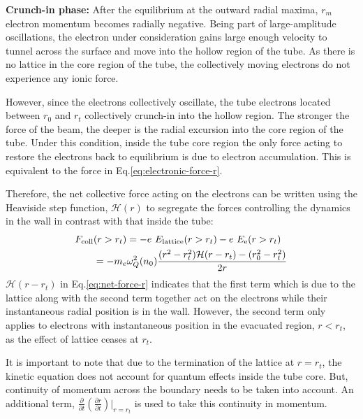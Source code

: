 \documentclass[aps,twocolumn,notitlepage,superscriptaddress]{revtex4-1}
\begin{document}
{\bf Crunch-in phase:} After the equilibrium at the outward radial maxima, $r_m$ electron momentum becomes radially negative. Being part of large-amplitude oscillations, the electron under consideration gains large enough velocity to tunnel across the surface and move into the hollow region of the tube. As there is no lattice in the core region of the tube, the collectively moving electrons do not experience any ionic force.

However, since the electrons collectively oscillate, the tube electrons located between $r_0$ and $r_t$ collectively crunch-in into the hollow region. The stronger the force of the beam, the deeper is the radial excursion into the core region of the tube. Under this condition, inside the tube core region the only force acting to restore the electrons back to equilibrium is due to electron accumulation. This is equivalent to the force in Eq.\ref{eq:electronic-force-r}.

Therefore, the net collective force acting on the electrons can be written using the Heaviside step function, $\mathcal{H}(r)$ to segregate the forces controlling the dynamics in the wall in contrast with that inside the tube:
\begin{align}\label{eq:net-force-r}
\begin{split}
F_{\rm coll} &(r>r_t) = -e ~ E_{\rm lattice}(r > r_t) -e ~ E_{\rm e}(r > r_t) \\
								& = - m_e \omega_{Q}^2(n_0) \frac{ (r^2 - r_t^2) \mathcal{H}(r-r_t) - (r_0^2 - r_t^2)  }{2r}
\end{split}
\end{align}
$\mathcal{H}(r-r_t)$ in Eq.\ref{eq:net-force-r} indicates that the first term which is due to the lattice along with the second term together act on the electrons while their instantaneous radial position is in the wall. However, the second term only applies to electrons with instantaneous position in the evacuated region, $r < r_t$, as the effect of lattice ceases at $r_t$.

It is important to note that due to the termination of the lattice at $r=r_t$, the kinetic equation does not account for quantum effects inside the tube core. But, continuity of momentum across the boundary needs to be taken into account. An additional term, $\frac{\partial}{\partial t}\left(\frac{\partial r}{\partial t}\right) |_{r=r_t}$ is used to take this continuity in momentum.
\end{document}
